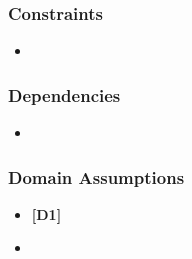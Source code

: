 \documentclass {article}
\begin{document}
		\subsubsection{Constraints}
		\begin{itemize}
		\item		
		\end{itemize}
		\subsubsection{Dependencies}
		\begin{itemize}
		\item 
		\end{itemize}
		
		\subsubsection{Domain Assumptions}
		\begin{itemize}
		 \item {\bf [D1]}  
		 \item 		\end{itemize}
		
\pagebreak	


	
\end{document}
